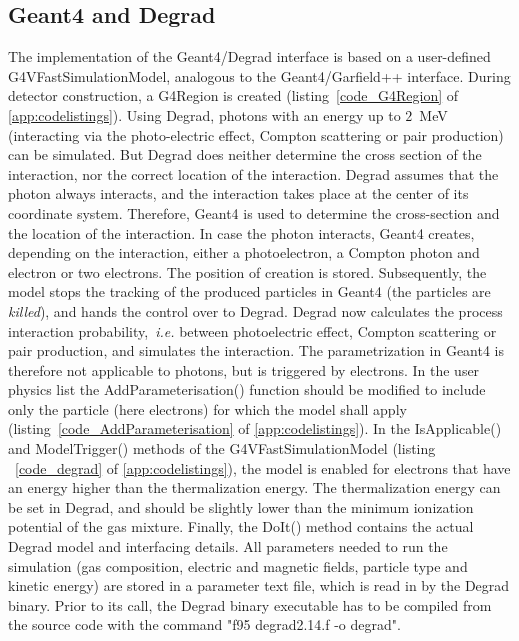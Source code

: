 \documentclass[preprint,12pt,sort&compress]{elsarticle}
\begin{document}
\subsection{Geant4 and Degrad}\label{Implementation Degrad}
The implementation of the Geant4/Degrad interface is based on a user-defined G4VFast\-Simulation\-Model, analogous to the Geant4/Garfield++ interface. During detector construction, a G4Region is created (listing~\ref{code_G4Region} of \ref{app:codelistings}). Using Degrad, photons with an energy up to $2$~MeV (interacting via the photo-electric effect, Compton scattering or pair production) can be simulated.  But Degrad does neither determine the cross section of the interaction, nor the correct location of the interaction. Degrad assumes that the photon always interacts, and the interaction takes place at the center of its coordinate system. Therefore, Geant4 is used to determine the cross-section and the location of the interaction. In case the photon interacts, Geant4 creates, depending on the interaction, either a photoelectron, a Compton photon and electron or two electrons. The position of creation is stored. Subsequently, the model stops the tracking of the produced particles in Geant4 (the particles are \textit{killed}), and hands the control over to Degrad. Degrad now calculates the process interaction probability,~\textit{i.e.} between photoelectric effect, Compton scattering or pair production, and simulates the interaction. The parametrization in Geant4 is therefore not applicable to photons, but is triggered by electrons. In the user physics list the AddParameterisation() function should be modified to include only the particle (here electrons) for which the model shall apply (listing~\ref{code_AddParameterisation} of \ref{app:codelistings}). In the IsApplicable() and ModelTrigger() methods of the G4VFast\-Simulation\-Model (listing ~\ref{code_degrad} of \ref{app:codelistings}), the model is enabled for electrons that have an energy higher than the thermalization energy. The thermalization energy can be set in Degrad, and should be slightly lower than the minimum ionization potential of the gas mixture. Finally, the DoIt() method contains the actual Degrad model and interfacing details. All parameters needed to run the simulation (gas composition, electric and magnetic fields, particle type and kinetic energy) are stored in a parameter text file, which is read in by the Degrad binary. Prior to its call, the Degrad binary executable has to be compiled from the source code with the command "f95 degrad2.14.f -o degrad". 
\end{document}

